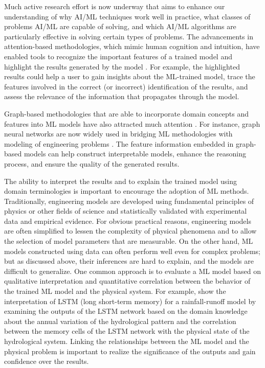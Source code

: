 Much active research effort is now underway that aims to enhance our understanding of why AI/ML techniques work well in practice, what classes of problems AI/ML are capable of solving, and which AI/ML algorithms are particularly effective in solving certain types of problems. The advancements in attention-based methodologies, which mimic human cognition and intuition, have enabled tools to recognize the important features of a trained model and highlight the results generated by the model \citep{xu2015show, zhou2016learning, kafle2017visual, nakka2018deep}. For example, the highlighted results could help a user to gain insights about the ML-trained model, trace the features involved in the correct (or incorrect) identification of the results, and assess the relevance of the information that propagates through the model.

Graph-based methodologies that are able to incorporate domain concepts and features into ML models have also attracted much attention \citep{koller2009probabilistic, baru2017open, hamilton2017representation, wu2020comprehensive}. For instance, graph neural networks are now widely used in bridging ML methodologies with modeling of engineering problems \citep{seo2019differentiable, park2019physicsinduced}. The feature information embedded in graph-based models can help construct interpretable models, enhance the reasoning process, and ensure the quality of the generated results. 

The ability to interpret the results and to explain the trained model using domain terminologies is important to encourage the adoption of ML methods. Traditionally, engineering models are developed using fundamental principles of physics or other fields of science and statistically validated with experimental data and empirical evidence. For obvious practical reasons, engineering models are often simplified to lessen the complexity of physical phenomena and to allow the selection of model parameters that are measurable. On the other hand, ML models constructed using data can often perform well even for complex problems; but as discussed above, their inferences are hard to explain, and the models are difficult to generalize. One common approach is to evaluate a ML model based on qualitative interpretation and quantitative correlation between the behavior of the trained ML model and the physical system. For example, \citet{kratzert2019neuralhydrology} show the interpretation of LSTM (long short-term memory) for a rainfall-runoff model by examining the outputs of the LSTM network based on the domain knowledge about the annual variation of the hydrological pattern and the correlation between the memory cells of the LSTM network with the physical state of the hydrological system. Linking the relationships between the ML model and the physical problem is important to realize the significance of the outputs and gain confidence over the results. 

